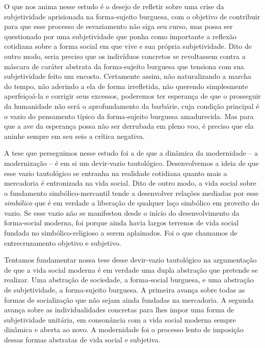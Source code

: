 O que nos anima nesse estudo é o desejo de refletir sobre uma crise da
subjetividade aprisionada na forma-sujeito burguesa, com o objetivo de
contribuir para que esse processo de esvaziamento não siga seu curso,
mas possa ser questionado por uma subjetividade que ponha como
importante a reflexão cotidiana sobre a forma social em que vive e sua
própria subjetividade. Dito de outro modo, seria preciso que os
indivíduos concretos se revoltassem contra a máscara de caráter abstrata
da forma-sujeito burguesa que tensiona com sua subjetividade feito um
encosto. Certamente assim, não naturalizando a marcha do tempo, não
aderindo a ela de forma irrefletida, não querendo simplesmente
aperfeiçoá-la e corrigir seus excessos, poderemos ter esperança de que o
prosseguir da humanidade não será o aprofundamento da barbárie, cuja
condição principal é o vazio do pensamento típico da forma-sujeito
burguesa amadurecida. Mas para que a ave da esperança possa não ser
derrubada em pleno voo, é preciso que ela aninhe sempre em seu seio a
crítica negativa.

A tese que perseguimos nesse estudo foi a de que a dinâmica da
modernidade -- a modernização -- é em si um devir-vazio tautológico.
Desenvolvemos a ideia de que esse vazio tautológico se entranha na
realidade cotidiana quanto mais a mercadoria é entronizada na vida
social. Dito de outro modo, a vida social sobre o fundamento
simbólico-mercantil tende a desenvolver relações mediadas por esse
\emph{simbólico} que é em verdade a liberação de qualquer laço simbólico
em proveito do vazio. Se esse vazio não se manifestou desde o início do
desenvolvimento da forma-social moderna, foi porque ainda havia largos
terrenos de vida social fundada no simbólico-religioso a serem
aplainados. Foi o que chamamos de entrecruzamento objetivo e subjetivo.

Tentamos fundamentar nossa tese desse devir-vazio tautológico na
argumentação de que a vida social moderna é em verdade uma dupla
abstração que pretende se realizar. Uma abstração de sociedade, a
forma-social burguesa, e uma abstração de subjetividade, a forma-sujeito
burguesa. A primeira avança sobre todas as formas de socialização que
não sejam ainda fundadas na mercadoria. A segunda avança sobre as
individualidades concretas para lhes impor uma forma de subjetividade
unitária, em consonância com a vida social moderna sempre dinâmica e
aberta ao novo. A modernidade foi o processo lento de imposição dessas
formas abstratas de vida social e subjetiva.

